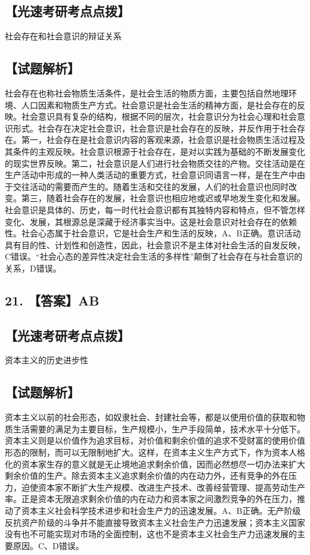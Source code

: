 \documentclass[UTF8,11pt]{ctexart}
\begin{document}
\subsection*{【光速考研考点点拨】}

社会存在和社会意识的辩证关系


\subsection*{【试题解析】}

社会存在也称社会物质生活条件，是社会生活的物质方面，主要包括自然地理环境、人口因素和物质生产方式。社会意识是社会生活的精神方面，是社会存在的反映。社会意识具有复杂的结构，根据不同的层次，社会意识分为社会心理和社会意识形式。社会存在决定社会意识，社会意识是社会存在的反映，并反作用于社会存在。第一，社会存在是社会意识内容的客观来源，社会意识是社会物质生活过程及其条件的主观反映。社会意识根源于社会存在，是对以实践为基础的不断发展变化的现实世界反映。第二，社会意识是人们进行社会物质交往的产物。交往活动是在生产活动中形成的一种人类活动的重要方式，社会意识同语言一样，是在生产中由于交往活动的需要而产生的。随着生活和交往的发展，人们的社会意识也同时改变。第三，随着社会存在的发展，社会意识也相应地或迟或早地发生变化和发展。社会意识是具体的、历史，每一时代社会意识都有其独特内容和特点，但不管怎样变化、发展，其根源总是深藏于经济事实当中。这是社会意识对社会存在的依赖性。社会心态属于社会意识，它是社会生产和生活的反映，A、B正确。意识活动具有目的性、计划性和创造性，因此，社会意识不是主体对社会生活的自发反映，C错误。“社会心态的差异性决定社会生活的多样性”颠倒了社会存在与社会意识的关系，D错误。


\subsection*{21. 【答案】AB}

\subsection*{【光速考研考点点拨】}

资本主义的历史进步性


\subsection*{【试题解析】}

资本主义以前的社会形态，如奴隶社会、封建社会等，都是以使用价值的获取和物质生活需要的满足为主要目标，生产规模小，生产手段简单，技术水平十分低下。资本主义则是以价值作为追求目标，对价值和剩余价值的追求不受财富的使用价值形态的限制，而可以无限制地扩大。这样，在资本主义生产方式下，作为资本人格化的资本家生存的意义就是无止境地追求剩余价值，因而必然想尽一切办法来扩大剩余价值的生产。除去资本主义追求剩余价值的内在动力外，还有竞争的外在压力，迫使资本家不断扩大生产规模、改进生产技术、改善经营管理、提高劳动生产率。正是资本无限追求剩余价值的内在动力和资本家之间激烈竞争的外在压力，推动了资本主义社会科学技术进步和社会生产力的迅速发展。A、B正确。无产阶级反抗资产阶级的斗争并不能直接导致资本主义社会生产力迅速发展；资本主义国家没有也不可能实现对市场的全面控制，这也不是资本主义社会生产力迅速发展的主要原因。C、D错误。
\end{document}
